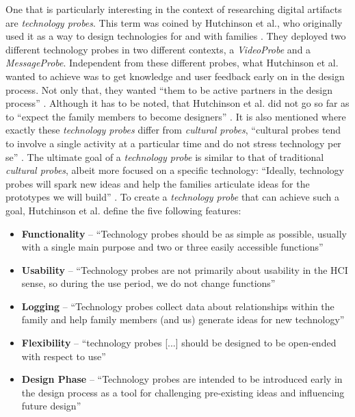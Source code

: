 One that is particularly interesting in the context of researching digital artifacts are \textit{technology probes}. This term was coined by Hutchinson et al., who originally used it as a way to design technologies for and with families \cite{hutchinson2003technology}. They deployed two different technology probes in two different contexts, a \textit{VideoProbe} and a \textit{MessageProbe}. Independent from these different probes, what Hutchinson et al. wanted to achieve was to get knowledge and user feedback early on in the design process. Not only that, they wanted \enquote{them to be active partners in the design process} \cite[p. 2]{hutchinson2003technology}. Although it has to be noted, that Hutchinson et al. did not go so far as to \enquote{expect the family members to become designers} \cite[p. 18]{hutchinson2003technology}. It is also mentioned where exactly these \textit{technology probes} differ from \textit{cultural probes}, \enquote{cultural probes tend to involve a single activity at a particular time and do not stress technology per se} \cite[p. 18]{hutchinson2003technology}. The ultimate goal of a \textit{technology probe} is similar to that of traditional \textit{cultural probes}, albeit more focused on a specific technology: \enquote{Ideally, technology probes will spark new ideas and help the families articulate ideas for the prototypes we will build} \cite[p. 18]{hutchinson2003technology}. To create a \textit{technology probe} that can achieve such a goal, Hutchinson et al. define the five following features:

\begin{itemize}
  \item{\textbf{Functionality} -- \enquote{Technology probes should be as simple as possible, usually with a single main purpose and two or three easily accessible functions} \cite[p. 18]{hutchinson2003technology}}
  \item{\textbf{Usability} -- \enquote{Technology probes are not primarily about usability in the HCI sense, so during the use period, we do not change functions} \cite[p. 18]{hutchinson2003technology}}
  \item{\textbf{Logging} -- \enquote{Technology probes collect data about relationships within the family and help family members (and us) generate ideas for new technology} \cite[p. 18]{hutchinson2003technology}}
  \item{\textbf{Flexibility} -- \enquote{technology probes [...] should be designed to be open-ended with respect to use} \cite[p. 19]{hutchinson2003technology}}
  \item{\textbf{Design Phase} -- \enquote{Technology probes are intended to be introduced early in the design process as a tool for challenging pre-existing ideas and influencing future design} \cite[p. 19]{hutchinson2003technology}}
\end{itemize}

